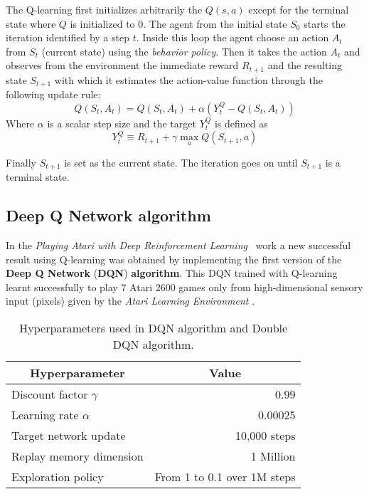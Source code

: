 The Q-learning first initializes arbitrarily the $Q(s,a)$ except for the terminal state where $Q$ is initialized to 0.
The agent from the initial state $S_0$ starts the iteration identified by a step $t$. Inside this loop the agent choose an action $A_t$ from $S_t$ (current state) using the \textit{behavior policy}. Then it takes the action $A_t$ and observes from the environment the immediate reward $R_{t+1}$ and the resulting state $S_{t+1}$ with which it estimates the action-value function through the following update rule:
\begin{equation}
	Q(S_t, A_t) = Q(S_t, A_t) + \alpha (Y^Q_t - Q(S_t, A_t))
\end{equation}
Where $\alpha$ is a scalar step size and the target $Y^Q_t$ is defined as
\begin{equation}
	Y^Q_t \equiv R_{t+1} + \gamma \max_{a} Q(S_{t+1}, a)
\end{equation}

Finally $S_{t+1}$ is set as the current state. The iteration goes on until $S_{t+1}$ is a terminal state.

\subsection{Deep Q Network algorithm}
\label{subsec:DQN}

In the \textit{Playing Atari with Deep Reinforcement Learning}~\cite{DBLP:journals/corr/MnihKSGAWR13} work a new successful result using Q-learning was obtained by implementing the first version of the \textbf{Deep Q Network} (\textbf{DQN}) \textbf{algorithm}. This DQN trained with Q-learning learnt successfully to play 7 Atari 2600 games only from high-dimensional sensory input (pixels) given by the \textit{Atari Learning Environment} \cite{ArcadeLearningEnvironment}.

\begin{table}[]
	\centering
	\begin{tabular}{|l|r|}
		\hline
		\multicolumn{1}{|c|}{\textbf{Hyperparameter}} &
		\multicolumn{1}{|c|}{\textbf{Value}}        \\
		\hline
		Discount factor $\gamma$ & 0.99                        \\
		Learning rate $\alpha$   & 0.00025                     \\
		Target network update    & 10,000 steps                \\
		Replay memory dimension  & 1 Million                   \\
		Exploration policy       & From 1 to 0.1 over 1M steps \\
		\hline
	\end{tabular}
	\caption{Hyperparameters used in DQN algorithm and Double DQN algorithm.}
	\label{fig:dqn-hyperparams}
\end{table}

